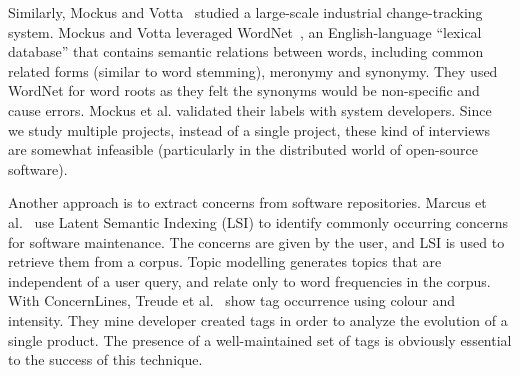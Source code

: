 \documentclass[smallextended]{svjour3}       %
\begin{document}

Similarly, Mockus and Votta~\cite{Mockus00} studied a large-scale industrial change-tracking system. 
Mockus and Votta leveraged WordNet~\cite{Fellbaum1998}, an English-language ``lexical database'' that contains semantic relations between words,
including common related forms (similar to word stemming), meronymy and synonymy.
They used WordNet for word roots as they felt the synonyms would be
non-specific and cause errors.
Mockus et al. validated their labels with system developers.
Since we study multiple projects, instead of a single project, these
kind of interviews are somewhat infeasible (particularly in the distributed world of open-source software).

Another approach is to extract concerns from software repositories.
Marcus et al.~\cite{marcus04wcre} use Latent Semantic Indexing (LSI)
to identify commonly occurring concerns for software maintenance. 
The
concerns are given by the user, and LSI is used to retrieve them from
a corpus. 
Topic modelling generates topics that are independent of a user query, and relate only to word frequencies in the corpus.
With ConcernLines, Treude et al.~\cite{treude09cl} show tag occurrence
using colour and intensity. 
They mine
developer created tags 
in order to analyze the evolution of a single product.
The presence of a well-maintained set of tags is obviously essential to the success of this technique.

\end{document}
